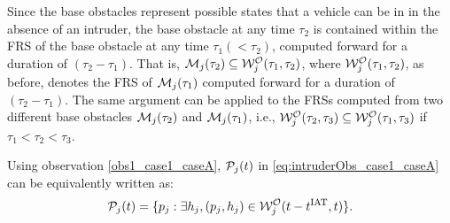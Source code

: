 \begin{itemize}[leftmargin=*]
\begin{observation} \label{obs1_case1_caseA}
Since the base obstacles represent possible states that a vehicle can be in in the absence of an intruder, the base obstacle at any time $\tau_2$ is contained within the FRS of the base obstacle at any time $\tau_1 (< \tau_2)$, computed forward for a duration of $(\tau_2-\tau_1).$ That is, $\mathcal{M}_j(\tau_2) \subseteq \mathcal{W}_{j}^{\mathcal{O}}(\tau_1, \tau_2)$, where $\mathcal{W}_{j}^{\mathcal{O}}(\tau_1, \tau_2)$, as before, denotes the FRS of $\mathcal{M}_j(\tau_1)$ computed forward for a duration of $(\tau_2-\tau_1)$. The same argument can be applied to the FRSs computed from two different base obstacles $\mathcal{M}_j(\tau_2)$ and $\mathcal{M}_j(\tau_1)$, i.e., $\mathcal{W}_{j}^{\mathcal{O}}(\tau_2, \tau_3) \subseteq \mathcal{W}_{j}^{\mathcal{O}}(\tau_1, \tau_3)$ if $\tau_1 < \tau_2 < \tau_3$.
\end{observation}

Using observation \ref{obs1_case1_caseA}, $\mathcal{P}_j(t)$ in \eqref{eq:intruderObs_case1_caseA} can be equivalently written as:
\begin{equation} \label{eq:intruderObs_case1_caseA_inter}
\pfrs_j(t) = \{p_j: \exists \npos_j, (p_j, \npos_j) \in \frs_{j}^{\mathcal{O}}(t-\iat, t) \}.
\end{equation}


\end{itemize}

